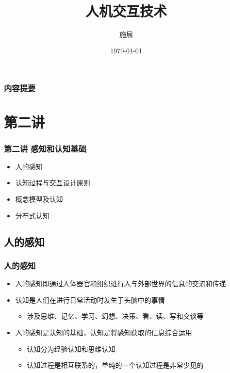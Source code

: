\documentclass{beamer}
\title{人机交互技术}
\author{施展}
\institute{华中科技大学~武汉光电国家实验室}
\date{\today}
\begin{document}
\begin{frame}
	\titlepage
\end{frame}

\begin{frame}
	\frametitle{内容提要}
	\tableofcontents
\end{frame}

\section{第二讲}
\begin{frame}
	\frametitle{第二讲 感知和认知基础}
	\begin{itemize}
		\item 人的感知
		\item 认知过程与交互设计原则
		\item 概念模型及认知
		\item 分布式认知
	\end{itemize}
\end{frame}

\subsection{人的感知}
\begin{frame}
	\frametitle{人的感知}
	\beamertemplatetransparentcovereddynamicmedium 
	\begin{itemize}[<+->]
		\item 人的感知即通过人体器官和组织进行人与外部世界的信息的交流和传递
		\item 认知是人们在进行日常活动时发生于头脑中的事情
		\begin{itemize}
			\item 涉及思维、记忆、学习、幻想、决策、看、读、写和交谈等
		\end{itemize}
		\item 人的感知是认知的基础，认知是将感知获取的信息综合运用
		\begin{itemize}
			\item 认知分为经验认知和思维认知
			\item 认知过程是相互联系的，单纯的一个认知过程是非常少见的
		\end{itemize}
	\end{itemize}
\end{frame}
\end{document}
